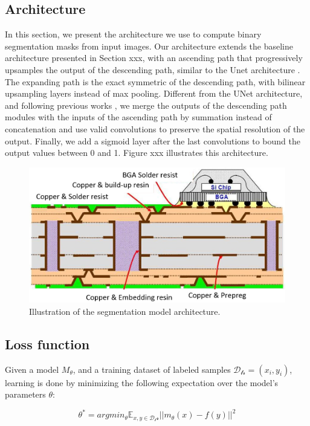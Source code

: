 \documentclass[10pt,twocolumn,letterpaper]{article}
\begin{document}
\subsection{Architecture}
% 
In this section, we present the architecture we use 
to compute binary segmentation masks from input images.
Our architecture extends the baseline architecture presented in Section xxx,
with an ascending path that progressively upsamples the output
of the descending path, similar to the Unet architecture \cite{}.
The expanding path is the exact symmetric of the descending path,
with bilinear upsampling layers instead of max pooling.
Different from the UNet architecture, and following previous works \cite{},
we merge the outputs of the descending path modules with the inputs of the ascending path 
by summation instead of concatenation and use valid convolutions 
to preserve the spatial resolution of the output.
Finally, we add a sigmoid layer after the last convolutions to bound the output values between 0 and 1.
Figure xxx illustrates this architecture.

\begin{figure}[h]
	\centering
	\includegraphics[width=0.9\linewidth]{"./figures/Figure1"}
	\caption{
		Illustration of the segmentation model architecture.
	}
\end{figure}

\subsection{Loss function}

Given a model $M_{\theta}$, and a training dataset of labeled samples $\mathcal{D_{tr}}={(x_i, y_i)}$,
learning is done by minimizing the following expectation over the model's parameters $\theta$:

$$\theta^* = argmin_{\theta} \mathbb{E}_{x,y \in \mathcal{D_tr}} ||m_{\theta}(x) - f(y) ||^2 $$
\end{document}
